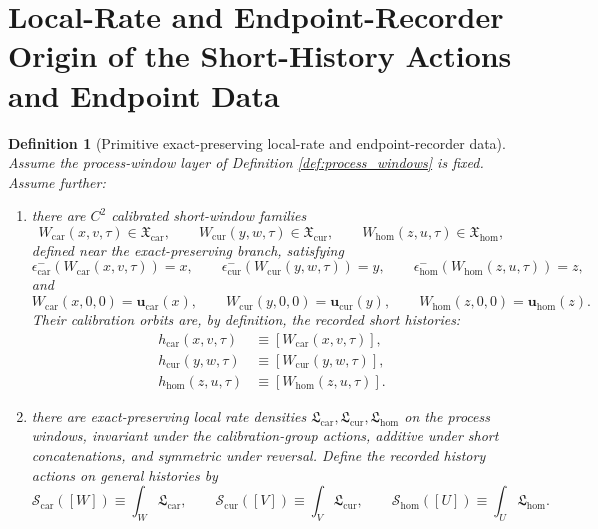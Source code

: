 \documentclass[11pt]{article}
\newcommand{\TensorHistoryAction}{\mathscr S_{\mathrm{car}}}
\newcommand{\CurHistoryAction}{\mathscr S_{\mathrm{cur}}}
\newcommand{\HomHistoryAction}{\mathscr S_{\mathrm{hom}}}
\newcommand{\TensorWindowClass}{\mathfrak X_{\mathrm{car}}}
\newcommand{\CurWindowClass}{\mathfrak X_{\mathrm{cur}}}
\newcommand{\HomWindowClass}{\mathfrak X_{\mathrm{hom}}}
\newcommand{\TensorLocalRate}{\mathfrak L_{\mathrm{car}}}
\newcommand{\CurLocalRate}{\mathfrak L_{\mathrm{cur}}}
\newcommand{\HomLocalRate}{\mathfrak L_{\mathrm{hom}}}
\newtheorem{definition}{Definition}
\begin{document}
\section{Local-Rate and Endpoint-Recorder Origin of the Short-History Actions and Endpoint Data}

\begin{definition}[Primitive exact-preserving local-rate and endpoint-recorder data]
\label{def:local_rate_endpoint}
Assume the process-window layer of Definition \ref{def:process_windows} is fixed. Assume further:
\begin{enumerate}
    \item there are \(C^2\) calibrated short-window families
    \[
    W_{\mathrm{car}}(x,v,\tau)\in\TensorWindowClass,\qquad
    W_{\mathrm{cur}}(y,w,\tau)\in\CurWindowClass,\qquad
    W_{\mathrm{hom}}(z,u,\tau)\in\HomWindowClass,
    \]
    defined near the exact-preserving branch, satisfying
    \[
    \epsilon_{\mathrm{car}}^{-}(W_{\mathrm{car}}(x,v,\tau))=x,\qquad
    \epsilon_{\mathrm{cur}}^{-}(W_{\mathrm{cur}}(y,w,\tau))=y,\qquad
    \epsilon_{\mathrm{hom}}^{-}(W_{\mathrm{hom}}(z,u,\tau))=z,
    \]
    and
    \[
    W_{\mathrm{car}}(x,0,0)=\mathbf u_{\mathrm{car}}(x),\qquad
    W_{\mathrm{cur}}(y,0,0)=\mathbf u_{\mathrm{cur}}(y),\qquad
    W_{\mathrm{hom}}(z,0,0)=\mathbf u_{\mathrm{hom}}(z).
    \]
    Their calibration orbits are, by definition, the recorded short histories:
    \begin{equation}
    \begin{aligned}
    h_{\mathrm{car}}(x,v,\tau)&\equiv[W_{\mathrm{car}}(x,v,\tau)],\\
    h_{\mathrm{cur}}(y,w,\tau)&\equiv[W_{\mathrm{cur}}(y,w,\tau)],\\
    h_{\mathrm{hom}}(z,u,\tau)&\equiv[W_{\mathrm{hom}}(z,u,\tau)].
    \end{aligned}
    \label{eq:short_histories_from_windows}
    \end{equation}
    \item there are exact-preserving local rate densities \(\TensorLocalRate,\CurLocalRate,\HomLocalRate\) on the process windows, invariant under the calibration-group actions, additive under short concatenations, and symmetric under reversal. Define the recorded history actions on general histories by
    \begin{equation}
    \TensorHistoryAction([W])\equiv\int_{W}\TensorLocalRate,\qquad
    \CurHistoryAction([V])\equiv\int_{V}\CurLocalRate,\qquad
    \HomHistoryAction([U])\equiv\int_{U}\HomLocalRate.

\end{equation}
\end{enumerate}
\end{definition}
\end{document}
